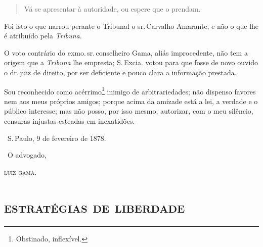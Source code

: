 \begin{quote}
Vá se apresentar à autoridade, ou espere que o prendam.
\end{quote}

Foi isto o que narrou perante o Tribunal o sr.\,Carvalho Amarante, e não
o que lhe é atribuído pela \emph{Tribuna}.

O voto contrário do exmo.\,sr.\,conselheiro Gama, aliás improcedente, não
tem a origem que a \emph{Tribuna} lhe empresta; S.\,Excia. votou para que
fosse de novo ouvido o dr.\,juiz de direito, por ser deficiente e pouco
clara a informação prestada.

Sou reconhecido como acérrimo\footnote{Obstinado, inflexível.}
inimigo de arbitrariedades;
não dispenso favores nem aos meus próprios amigos; porque acima da
amizade está a lei, a verdade e o público interesse; mas não posso, por
isso mesmo, autorizar, com o meu silêncio, censuras injustas esteadas em
inexatidões.

\bigskip

\hfill\ S.\,Paulo, 9 de fevereiro de 1878.\smallskip

\hfill\ O advogado,

\hfill\textsc{luiz gama.}


\pagebreak
\thispagestyle{empty}
\movetooddpage
\thispagestyle{empty}
\begingroup\makeatletter\@openrightfalse
\part{\textsc{estratégias de liberdade}}

\mbox{}\vfill
\thispagestyle{empty}

